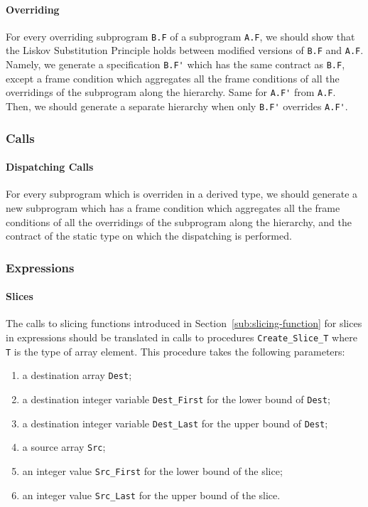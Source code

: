 \documentclass{article}
\begin{document}
\paragraph{Overriding}

For every overriding subprogram \verb|B.F| of a subprogram \verb|A.F|, we
should show that the Liskov Substitution Principle holds between modified
versions of \verb|B.F| and \verb|A.F|. Namely, we generate a specification
\verb|B.F'| which has the same contract as \verb|B.F|, except a frame condition
which aggregates all the frame conditions of all the overridings of the
subprogram along the hierarchy. Same for \verb|A.F'| from \verb|A.F|. Then, we
should generate a separate hierarchy when only \verb|B.F'| overrides
\verb|A.F'|.

\subsubsection{Calls}

\paragraph{Dispatching Calls}

For every subprogram which is overriden in a derived type, we should generate a
new subprogram which has a frame condition which aggregates all the frame
conditions of all the overridings of the subprogram along the hierarchy, and
the contract of the static type on which the dispatching is performed.

\subsubsection{Expressions}

\paragraph{Slices}

The calls to slicing functions introduced in Section~\ref{sub:slicing-function}
for slices in expressions should be translated in calls to procedures
\verb|Create_Slice_T| where \verb|T| is the type of array element. This
procedure takes the following parameters:
\begin{enumerate}
\item a destination array \verb|Dest|;
\item a destination integer variable \verb|Dest_First| for the lower bound of
  \verb|Dest|;
\item a destination integer variable \verb|Dest_Last| for the upper bound of
  \verb|Dest|;
\item a source array \verb|Src|;
\item an integer value \verb|Src_First| for the lower bound of the slice;
\item an integer value \verb|Src_Last| for the upper bound of the slice.
\end{enumerate}
\end{document}
